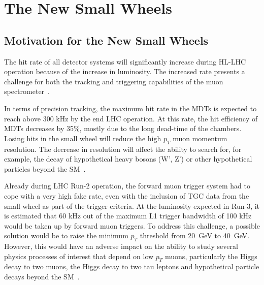 
\chapter{The New Small Wheels}
\label{chap:nsw}

\section{Motivation for the New Small Wheels}

The hit rate of all detector systems will significantly increase during HL-LHC operation because of the increase in luminosity. The increased rate presents a challenge for both the tracking and triggering capabilities of the muon spectrometer~\cite{nsw_tdr}.

In terms of precision tracking, the maximum hit rate in the MDTs is expected to reach above 300 kHz by the end LHC operation.  At this rate, the hit efficiency of MDTs decreases by 35\%, mostly due to the long dead-time of the chambers. Losing hits in the small wheel will reduce the high $p_T$ muon momentum resolution. The decrease in resolution will affect the ability to search for, for example, the decay of hypothetical heavy bosons (W', Z') or other hypothetical particles beyond the SM~\cite{dainese_physics_2018}.

Already during LHC Run-2 operation, the forward muon trigger system had to cope with a very high fake rate, even with the inclusion of TGC data from the small wheel as part of the trigger criteria.  At the luminosity expected in Run-3, it is estimated that 60 kHz out of the maximum L1 trigger bandwidth of 100 kHz would be taken up by forward muon triggers. To address this challenge, a possible solution would be to raise the minimum $p_T$ threshold from \SI{20}{\giga\electronvolt} to \SI{40}{\giga\electronvolt}. However, this would have an adverse impact on the ability to study several physics processes of interest that depend on low $p_T$ muons, particularly the Higgs decay to two muons, the Higgs decay to two tau leptons and hypothetical particle decays beyond the SM~\cite{nsw_tdr}.

